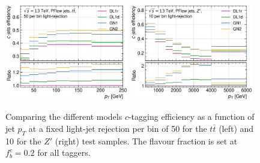 \begin{figure}[h!]
    \centering
    \includegraphics[width=0.48\textwidth]{Images/FTAG/GN/GN2/pt_plots/pt_ttbar_c_eff_fixedlight.png}
    \includegraphics[width=0.48\textwidth]{Images/FTAG/GN/GN2/pt_plots/pt_zp_c_eff_fixedlight.png}
    \caption{Comparing the different models $c$-tagging efficiency as a function of jet $p_T$ at a fixed light-jet rejection per bin of 50 for the $t\bar{t}$ (left) and 10 for the $Z'$ (right) test samples. The flavour fraction is set at $f^c_b = 0.2$ for all taggers.}
    \label{apfig:GNxptc_efffixedl}
  \end{figure} 

